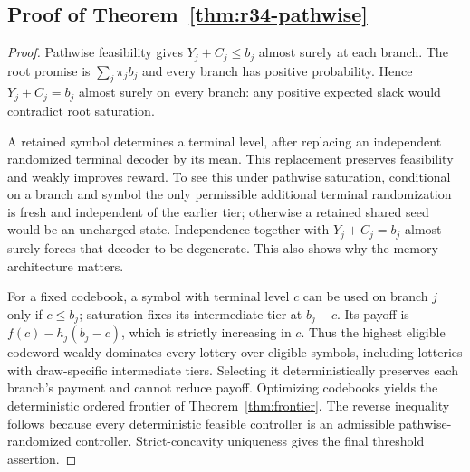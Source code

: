 \subsection{Proof of Theorem~\ref{thm:r34-pathwise}}\label{ec-proof-thm-r34-pathwise}
\begin{proof}
Pathwise feasibility gives $Y_j+C_j\leq b_j$ almost surely at each branch. The root promise is $\sum_j\pi_jb_j$ and every branch has positive probability. Hence $Y_j+C_j=b_j$ almost surely on every branch: any positive expected slack would contradict root saturation.

A retained symbol determines a terminal level, after replacing an independent randomized terminal decoder by its mean. This replacement preserves feasibility and weakly improves reward. To see this under pathwise saturation, conditional on a branch and symbol the only permissible additional terminal randomization is fresh and independent of the earlier tier; otherwise a retained shared seed would be an uncharged state. Independence together with $Y_j+C_j=b_j$ almost surely forces that decoder to be degenerate. This also shows why the memory architecture matters.

For a fixed codebook, a symbol with terminal level $c$ can be used on branch $j$ only if $c\leq b_j$; saturation fixes its intermediate tier at $b_j-c$. Its payoff is $f(c)-h_j(b_j-c)$, which is strictly increasing in $c$. Thus the highest eligible codeword weakly dominates every lottery over eligible symbols, including lotteries with draw-specific intermediate tiers. Selecting it deterministically preserves each branch's payment and cannot reduce payoff. Optimizing codebooks yields the deterministic ordered frontier of Theorem~\ref{thm:frontier}. The reverse inequality follows because every deterministic feasible controller is an admissible pathwise-randomized controller. Strict-concavity uniqueness gives the final threshold assertion.\end{proof}

